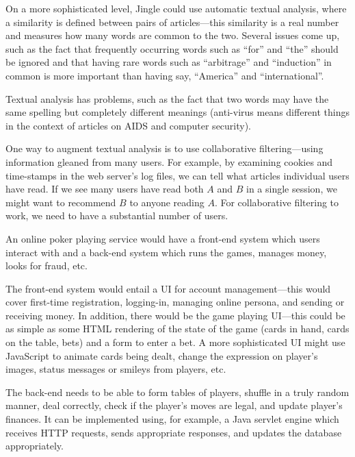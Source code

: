 On a more sophisticated level, Jingle could use automatic textual analysis,
where a similarity is defined between pairs of articles---this similarity is
a real number and measures how many words are common to the two. Several 
issues come up, such as the fact that frequently occurring words such
as ``for'' and ``the'' should be ignored and that having
rare words such as ``arbitrage'' and ``induction'' in common is more important
than having say, ``America'' and ``international''.

Textual analysis has problems, such as the fact that two words may
have the same spelling but completely different meanings (anti-virus
means different things in the context of articles on AIDS and computer security).

One way to augment textual analysis is to use collaborative filtering---using
information gleaned from many users. For example, by examining cookies and
time-stamps in the web server's log files, we can tell what articles individual users have read.
If we see many users have read both $A$ and $B$ in a single session, we might
want to recommend $B$ to anyone reading $A$. For collaborative filtering to work,
we need to have a substantial number of users.




An online poker playing service would have a front-end system
which users interact with and a back-end system which runs
the games, manages money, looks for fraud, etc.

The front-end system would entail a UI for account management---this would cover
first-time registration, logging-in, managing online persona, and 
sending or receiving money.
In addition, there would be the game playing UI---this could be
as simple as some HTML rendering of the state of the game (cards in
hand, cards on the table, bets) and a form to enter a bet.
A more sophisticated UI might use JavaScript to animate cards being
dealt, change the expression on player's images, status messages or smileys from
players, etc.

The back-end needs to be able to form tables of players,
shuffle in a truly random manner,
deal correctly, check if the player's moves are legal, and update 
player's finances.  It can be implemented using, for example, a Java servlet
engine which receives HTTP requests, sends appropriate responses, and updates
the database appropriately.

